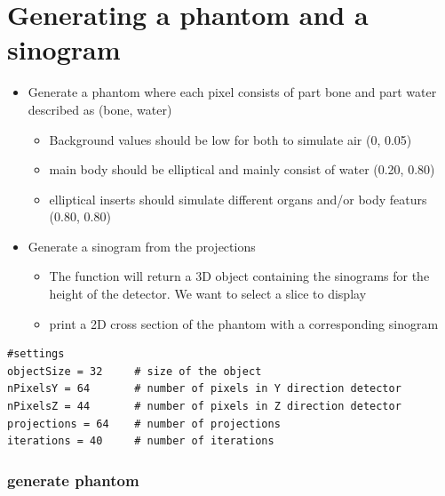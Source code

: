 \section{Generating a phantom and a sinogram}

\begin{itemize}
\item Generate a phantom where each pixel consists of part bone and part water described as (bone, water)

\begin{itemize}
\item Background values should be low for both to simulate air (0, 0.05)
\item main body should be elliptical and mainly consist of water (0.20, 0.80)
\item elliptical inserts should simulate different organs and/or body featurs (0.80, 0.80)
\end{itemize}


\item Generate a sinogram from the projections

\begin{itemize}
\item The function will return a 3D object containing the sinograms for the height of the detector. We want to select a slice to display
\item print a 2D cross section of the phantom with a corresponding sinogram
\end{itemize}
\end{itemize}

\begin{verbatim}
#settings
objectSize = 32     # size of the object
nPixelsY = 64       # number of pixels in Y direction detector
nPixelsZ = 44       # number of pixels in Z direction detector
projections = 64    # number of projections
iterations = 40     # number of iterations
\end{verbatim}

\subsubsection{generate phantom}

